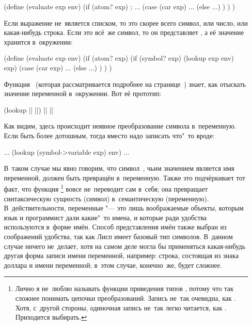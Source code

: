 \begin{minipage}{\textwidth - \parindent}
\begin{code:lisp}
(define (evaluate exp env)
  (if (atom? exp)   ;  {\equals} 
      ...
      (case (car exp)
        ...
        (else ...) ) ) )
\end{code:lisp}
\end{minipage}

Если выражение не~является списком, то это скорее всего символ, или число, или
какая-нибудь строка. Если это всё~же символ, то он представляет
, а её значение хранится в~окружении:

\begin{code:lisp}
(define (evaluate exp env)
  (if (atom? exp)
      (if (symbol? exp) (lookup exp env) exp)
      (case (car exp)
        ...
        (else ...) ) ) )
\end{code:lisp}

Функция~ (которая рассматривается подробнее на
странице~\pageref{basics/sect:repr-the-env}) знает, как отыскать значение
переменной в~окружении. Вот её прототип:

\begin{code:lisp}
(lookup || ||) |\is| ||
\end{code:lisp}

Как видим, здесь происходит неявное преобразование символа в~переменную. Если
быть более дотошным, тогда вместо  надо записать что"~то
вроде:

\begin{code:lisp}
... (lookup (symbol->variable exp) env) ...
\end{code:lisp}

В~таком случае мы явно говорим, что символ~, чьим значением является имя
переменной, должен быть превращён в~переменную. Также это подчёркивает тот факт,
что функция \footnote{Лично я не~люблю называть функции
приведения типов , потому что так сложнее понимать цепочки
преобразований. Запись  не~так
очевидна, как . Хотя, с~другой
стороны, одиночная запись  не~так легко читается, как
. Приходится выбирать.} вовсе не~переводит  сам
в~себя; она превращает синтаксическую сущность (символ) в~семантическую
(переменную). В~действительности, переменные "--- это лишь воображаемые объекты,
которым язык и программист дали какие"~то имена, и которые ради удобства
используются в~форме имён. Способ представления имён также выбран из соображений
удобства, так как Лисп имеет базовый тип символов. В~данном случае
 ничего не~делает, хотя на самом деле могла бы применяться
какая-нибудь другая форма записи имени переменной, например: строка, состоящая
из знака доллара и имени переменной; в~этом случае, конечно~же,
 будет сложнее.

